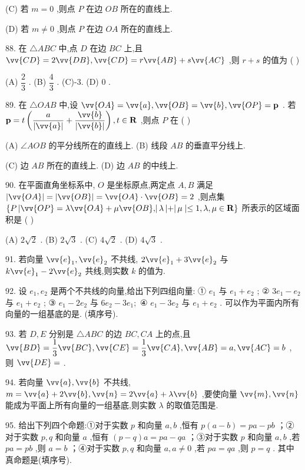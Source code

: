 (C) 若 $m = 0$ ,则点 $P$ 在边 ${OB}$ 所在的直线上.

(D) 若 $m \neq  0$ ,则点 $P$ 在边 ${OA}$ 所在的直线上.

88. 在 $\bigtriangleup {ABC}$ 中,点 $D$ 在边 ${BC}$ 上,且 $\vv{CD} = 2\vv{DB},\vv{CD} = r\vv{AB} + s\vv{AC}$ ,则 $r + s$ 的值为 (   )

(A) $\dfrac{2}{3}$ . (B) $\dfrac{4}{3}$ . (C)-3. (D) 0 .

89. 在 $\bigtriangleup {OAB}$ 中,设 $\vv{OA} = \vv{a},\vv{OB} = \vv{b},\vv{OP} = \mathbf{p}$ . 若 $\mathbf{p} = t\left( {\dfrac{a}{\left| \vv{a}\right| } + \dfrac{\vv{b}}{\left| \vv{b}\right| }}\right) ,t \in  \mathbf{R}$ ,则点 $P$ 在 (   )

(A) $\angle {AOB}$ 的平分线所在的直线上. (B) 线段 ${AB}$ 的垂直平分线上.

(C) 边 ${AB}$ 所在的直线上. (D) 边 ${AB}$ 的中线上.

90. 在平面直角坐标系中, $O$ 是坐标原点,两定点 $A,B$ 满足 $\left| \vv{OA}\right|  = \left| \vv{OB}\right|  = \vv{OA} \cdot  \vv{OB} = 2$ ,则点集 $\{ P\left| {\vv{OP} = \lambda \vv{OA} + \mu \vv{OB},}\right| \lambda \left| +\right| \mu  \mid   \leq  1,\lambda ,\mu  \in  \mathbf{R}\}$ 所表示的区域面积是 (   )

(A) $2\sqrt{2}$ . (B) $2\sqrt{3}$ . (C) $4\sqrt{2}$ . (D) $4\sqrt{3}$ .

91. 若向量 ${\vv{e}}_{1},{\vv{e}}_{2}$ 不共线, $2{\vv{e}}_{1} + 3{\vv{e}}_{2}$ 与 $k{\vv{e}}_{1} - 2{\vv{e}}_{2}$ 共线,则实数 $k$ 的值为\blkda{}.

92. 设 ${e}_{1},{e}_{2}$ 是两个不共线的向量,给出下列四组向量: ① ${e}_{1}$ 与 ${e}_{1} + {e}_{2}$ ; ② $3{e}_{1} - {e}_{2}$ 与 ${e}_{1} + {e}_{2}$ ; ③ ${e}_{1} - 2{e}_{2}$ 与 $6{e}_{2} - 3{e}_{1};$ ④ ${e}_{1} - 3{e}_{2}$ 与 ${e}_{1} + {e}_{2}$ . 可以作为平面内所有向量的一组基底的是\blkda{}. (填序号).

93. 若 $D,E$ 分别是 $\bigtriangleup {ABC}$ 的边 ${BC},{CA}$ 上的点,且 $\vv{BD} = \dfrac{1}{3}\vv{BC},\vv{CE} = \dfrac{1}{3}\vv{CA},\vv{AB} = a,\vv{AC} = b$ , 则 $\vv{DE} =$ \blkda{}.

94. 若向量 $\vv{a},\vv{b}$ 不共线, $m = \vv{a} + 2\vv{b},\vv{n} = 2\vv{a} + \lambda \vv{b}$ ,要使向量 $\vv{m},\vv{n}$ 能成为平面上所有向量的一组基底,则实数 $\lambda$ 的取值范围是\blkda{}.

95. 给出下列四个命题:①对于实数 $p$ 和向量 $a,b$ ,恒有 $p\left( {a - b}\right)  = {pa} - {pb}$ ；②对于实数 $p,q$ 和向量 $a$ ,恒有 $\left( {p - q}\right) a = {pa} - {qa}$ ；③对于实数 $p$ 和向量 $a,b$ ,若 ${pa} = {pb}$ ,则 $a = b$ ；④对于实数 $p,q$ 和向量 $a,a \neq  0$ ,若 ${pa} = {qa}$ ,则 $p = q$ . 其中真命题是\blkda{}(填序号).

